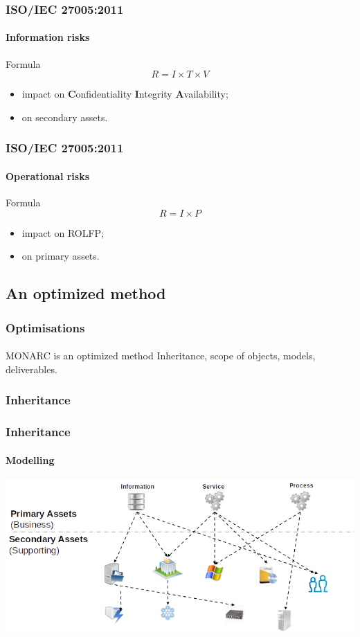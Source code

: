\begin{frame}
    \frametitle{ISO/IEC 27005:2011}
    \framesubtitle{Information risks}
    \begin{block}{Formula}
        $$R = I \times T \times V$$
        \begin{itemize}
            \item impact on \textbf{C}onfidentiality \textbf{I}ntegrity \textbf{A}vailability;
            \item on secondary assets.
        \end{itemize}
    \end{block}
\end{frame}


\begin{frame}
    \frametitle{ISO/IEC 27005:2011}
    \framesubtitle{Operational risks}
    \begin{block}{Formula}
        $$R = I \times P$$
        \begin{itemize}
            \item impact on ROLFP;
            \item on primary assets.
        \end{itemize}
    \end{block}
\end{frame}


\subsection{An optimized method}
\begin{frame}
    \frametitle{Optimisations}
    \framesubtitle{}
    \begin{block}{MONARC is an optimized method}
        Inheritance, scope of objects, models, deliverables.
    \end{block}
\end{frame}

\subsubsection{Inheritance}
\begin{frame}
    \frametitle{Inheritance}
    \framesubtitle{Modelling}
    \begin{center}
        \includegraphics[scale=0.45]{./images/MONARC-method-modelling.png}
    \end{center}
\end{frame}


